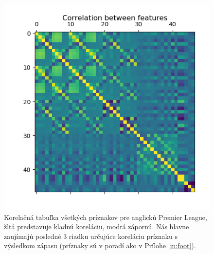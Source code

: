 \noindent
\begin{figure} \label{corr}
\includegraphics[scale=0.9]{../img/correng.png}
\caption{Korelačná tabuľka všetkých príznakov pre anglickú Premier League, žltá predstavuje kladnú koreláciu, modrá zápornú. Nás hlavne zaujímajú posledné 3 riadku určujúce koreláciu príznaku s výsledkom zápasu (príznaky sú v poradí ako v Prílohe \ref{in:foot}).}
\end{figure}

